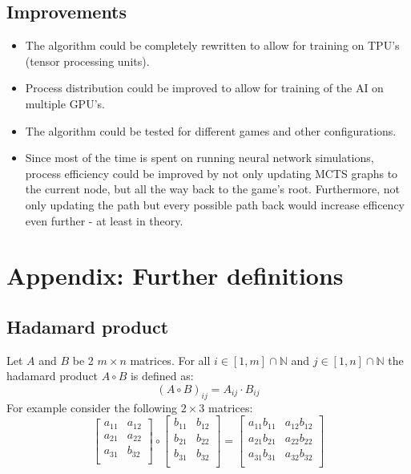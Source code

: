 \documentclass[12pt]{article}
\begin{document}
\subsection{Improvements}
\begin{itemize}
\item The algorithm could be completely rewritten to allow for training on TPU's (tensor processing units).
\item Process distribution could be improved to allow for training of the AI on multiple GPU's.
\item The algorithm could be tested for different games and other configurations.
\item Since most of the time is spent on running neural network simulations, process efficiency could be improved by not only updating MCTS graphs to the current node, but all the way back to the game's root. Furthermore, not only updating the path but every possible path back would increase efficency even further - at least in theory. 
\end{itemize}

\newpage
\section{Appendix: Further definitions}
\subsection{Hadamard product}\label{sec:hadamerd_product}
Let \(A\) and \(B\) be 2 \(m \times n\) matrices. For all \(i \in [1, m]\cap\mathbb N\) and \(j \in [1, n]\cap\mathbb N\)
the hadamard product \(A \circ B\) is defined as:
\begin{equation} \label{eq:defs:Hadamard product}
\left(A \circ B\right)_{ij} = A_{ij} \cdot B_{ij}
\end{equation}
For example consider the following \(2 \times 3\) matrices:
\[
\left[
\begin{array}{ll}
a_{11} & a_{12} \\
a_{21} & a_{22} \\
a_{31} & b_{32} \\
\end{array}
\right] \circ 
\left[
\begin{array}{ll}
b_{11} & b_{12} \\
b_{21} & b_{22} \\
b_{31} & b_{32} \\
\end{array}
\right] = 
\left[
\begin{array}{ll}
a_{11}b_{11} & a_{12}b_{12} \\
a_{21}b_{21} & a_{22}b_{22} \\
a_{31}b_{31} & a_{32}b_{32} \\
\end{array}
\right]
\]\\
\end{document}
